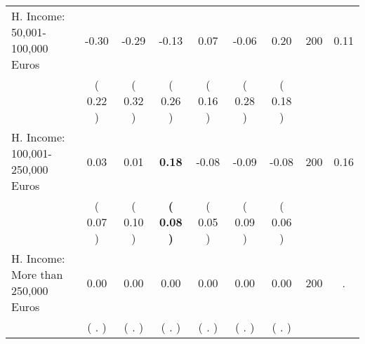 \begin{tabular}{lcccccccc}
H. Income: 50,001-100,000 Euros &     -0.30 &     -0.29 &     -0.13 &      0.07 &     -0.06 &      0.20 & 200 &       0.11 \\ 
 & (     0.22 ) & (     0.32 ) & (     0.26 ) & (     0.16 ) & (     0.28 ) & (     0.18 ) & \\
H. Income: 100,001-250,000 Euros &      0.03 &      0.01 & \textbf{     0.18} &     -0.08 &     -0.09 &     -0.08 & 200 &       0.16 \\ 
 & (     0.07 ) & (     0.10 ) & \textbf{(     0.08 )} & (     0.05 ) & (     0.09 ) & (     0.06 ) & \\
H. Income: More than 250,000 Euros &      0.00 &      0.00 &      0.00 &      0.00 &      0.00 &      0.00 & 200 &          . \\ 
 & (        . ) & (        . ) & (        . ) & (        . ) & (        . ) & (        . ) & \\
\bottomrule
\end{tabular}
